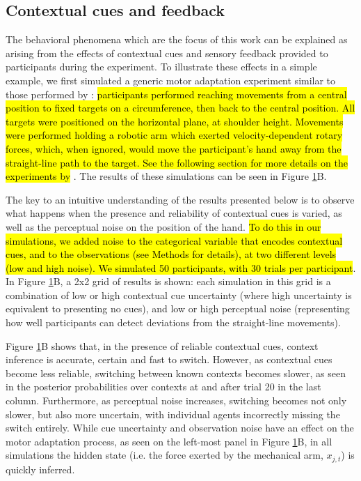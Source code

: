 \documentclass[a4paper,doc,floatsintext,natbib]{apa6}
\def \fref #1{Figure \ref{#1}}     %
\DeclareRobustCommand{\newcontent}[1]{\hl{#1}}
\begin{document}
\begin{figure}
\label{fig:model}
\end{figure}

\subsection{Contextual cues and feedback}
The behavioral phenomena which are the focus of this work can be explained as arising from the effects of contextual cues and sensory feedback provided to participants during the experiment. To illustrate these effects in a simple example, we first simulated a generic motor adaptation experiment similar to those performed by \cite{Davidson_Scaling_2004}: \newcontent{participants performed reaching movements from a central position to fixed targets on a circumference, then back to the central position. All targets were positioned on the horizontal plane, at shoulder height. Movements were performed holding a robotic arm which exerted velocity-dependent rotary forces, which, when ignored, would move the participant's hand away from the straight-line path to the target. See the following section for more details on the experiments by} \cite{Davidson_Scaling_2004}. The results of these simulations can be seen in \fref{fig:model}B.
  
The key to an intuitive understanding of the results presented below is to observe what happens when the presence and reliability of contextual cues is varied, as well as the perceptual noise on the position of the hand. \newcontent{To do this in our simulations, we added noise to the categorical variable that encodes contextual cues, and to the observations (see Methods for details), at two different levels (low and high noise). We simulated 50 participants, with 30 trials per participant}. In \fref{fig:model}B, a 2x2 grid of results is shown: each simulation in this grid is a combination of low or high contextual cue uncertainty (where high uncertainty is equivalent to presenting no cues), and low or high perceptual noise (representing how well participants can detect deviations from the straight-line movements).

\fref{fig:model}B shows that, in the presence of reliable contextual cues, context inference is accurate, certain and fast to switch. However, as contextual cues become less reliable, switching between known contexts becomes slower, as seen in the posterior probabilities over contexts at and after trial 20 in the last column. Furthermore, as perceptual noise increases, switching becomes not only slower, but also more uncertain, with individual agents incorrectly missing the switch entirely. While cue uncertainty and observation noise have an effect on the motor adaptation process, as seen on the left-most panel in \fref{fig:model}B, in all simulations the hidden state (i.e. the force exerted by the mechanical arm, $x_{j,t}$) is quickly inferred.
\end{document}
